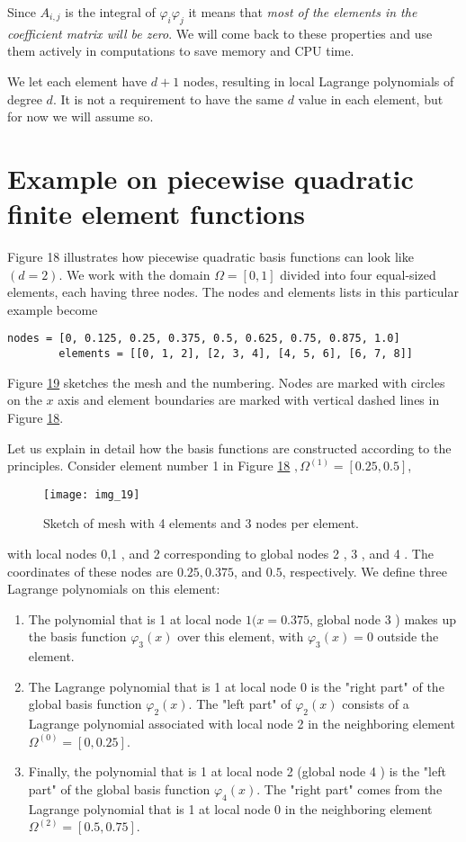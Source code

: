 \documentclass[../main.tex]{subfiles}
\begin{document}
	\noindent Since $A_{i, j}$ is the integral of $\varphi_{i} \varphi_{j}$ it means that \textit{most of the elements in the coefficient matrix will be zero}. We will come back to these properties and use them actively in computations to save memory and CPU time.
	
	We let each element have $d+1$ nodes, resulting in local Lagrange polynomials of degree $d$. It is not a requirement to have the same $d$ value in each element, but for now we will assume so.
	\section[Example on piecewise quadratic finite element functions]{Example on piecewise quadratic finite element functions}
	\label{sec:sec_3_3}
	\noindent Figure 18 illustrates how piecewise quadratic basis functions can look like $(d=2)$. We work with the domain $\Omega=[0,1]$ divided into four equal-sized elements, each having three nodes. The nodes and elements lists in this particular example become
	\begin{lstlisting}[numbers=none]
		nodes = [0, 0.125, 0.25, 0.375, 0.5, 0.625, 0.75, 0.875, 1.0]
		elements = [[0, 1, 2], [2, 3, 4], [4, 5, 6], [6, 7, 8]]	
	\end{lstlisting}
	Figure \hyperref[fig:img_19]{19} sketches the mesh and the numbering. Nodes are marked with circles on the $x$ axis and element boundaries are marked with vertical dashed lines in Figure \hyperref[fig:img_18]{18}.
	
	Let us explain in detail how the basis functions are constructed according to the principles. Consider element number 1 in Figure \hyperref[fig:img_18]{18} $, \Omega^{(1)}=[0.25,0.5]$,
	\begin{figure}[H]
		\centering
		\texttt{[image: img\_19]}
		\caption{Sketch of mesh with 4 elements and 3 nodes per element.}
		\label{fig:img_19}
	\end{figure}
	\noindent with local nodes 0,1 , and 2 corresponding to global nodes 2 , 3 , and 4 . The coordinates of these nodes are $0.25,0.375$, and $0.5$, respectively. We define three Lagrange polynomials on this element:
	\begin{enumerate}
		\item The polynomial that is 1 at local node $1(x=0.375$, global node 3 ) makes up the basis function $\varphi_{3}(x)$ over this element, with $\varphi_{3}(x)=0$ outside the element.
		\item The Lagrange polynomial that is 1 at local node 0 is the "right part" of the global basis function $\varphi_{2}(x)$. The "left part" of $\varphi_{2}(x)$ consists of a Lagrange polynomial associated with local node 2 in the neighboring element $\Omega^{(0)}=[0,0.25]$.
		\item Finally, the polynomial that is 1 at local node 2 (global node 4 ) is the "left part" of the global basis function $\varphi_{4}(x)$. The "right part" comes from the Lagrange polynomial that is 1 at local node 0 in the neighboring element $\Omega^{(2)}=[0.5,0.75]$.
	\end{enumerate}	
	
\end{document}
